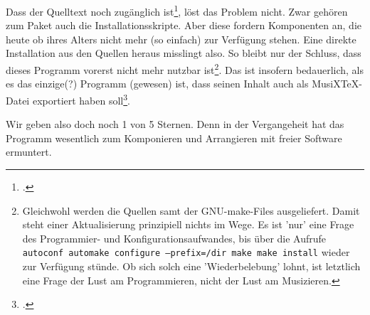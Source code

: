 Dass der Quelltext noch zugänglich
ist\footcite[vgl.][\nopage]{NoteeditRep2014a}, löst das Problem nicht. Zwar
gehören zum Paket auch die Installationsskripte. Aber diese fordern Komponenten an,
die heute ob ihres Alters nicht mehr (so einfach) zur Verfügung stehen. Eine
direkte Installation aus den Quellen heraus misslingt also. So bleibt nur der
Schluss, dass dieses Programm vorerst nicht mehr nutzbar ist\footnote{Gleichwohl
werden die Quellen samt der GNU-make-Files ausgeliefert. Damit steht einer
Aktualisierung prinzipiell nichts im Wege. Es ist 'nur' eine Frage des
Programmier- und Konfigurationsaufwandes, bis  über die Aufrufe
\texttt{autoconf automake configure --prefix=/dir make make install} wieder zur
Verfügung stünde. Ob sich solch eine 'Wiederbelebung' lohnt, ist letztlich eine
Frage der Lust am Programmieren, nicht der Lust am Musizieren. }. Das ist
insofern bedauerlich, als es das einzige(?) Programm (gewesen) ist, dass seinen
Inhalt auch als MusiX\TeX-Datei exportiert haben soll\footcite[vgl.][\nopage
wp]{Roitman2007a}.

Wir geben  also doch noch 1 von 5 Sternen. Denn in der
Vergangeheit hat das Programm wesentlich zum Komponieren und Arrangieren mit
freier Software ermuntert.


%
